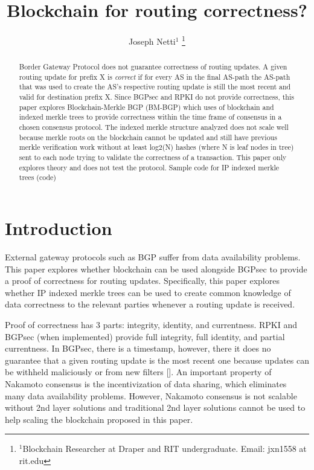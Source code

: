 \documentclass[letterpaper, 10 pt, conference]{ieeeconf}  %
\title{\LARGE \bf
Blockchain for routing correctness?
}
\author{Joseph Netti$^{1}$%
\thanks{$^{1}$Blockchain Researcher at Draper and RIT undergraduate. Email: jxn1558 at rit.edu}%
}
\begin{document}
\maketitle
\thispagestyle{empty}
\pagestyle{empty}


\begin{abstract}
Border Gateway Protocol does not guarantee correctness of routing updates. A given routing update for prefix X is \textit{correct} if for every AS in the final AS-path the AS-path that was used to create the AS’s respective routing update is still the most recent and valid for destination prefix X. Since BGPsec and RPKI do not provide correctness, this paper explores Blockchain-Merkle BGP (BM-BGP) which uses of blockchain and indexed merkle trees to provide correctness within the time frame of consensus in a chosen consensus protocol. The indexed merkle structure analyzed does not scale well because merkle roots on the blockchain cannot be updated and still have previous merkle verification work without at least log2(N) hashes (where N is leaf nodes in tree) sent to each node trying to validate the correctness of a transaction. This paper only explores theory and does not test the protocol. Sample code for IP indexed merkle trees (code)


\end{abstract}

\section{Introduction}
External gateway protocols such as BGP suffer from data availability problems. This paper explores whether blockchain can be used alongside BGPsec to provide a proof of correctness for routing updates. Specifically, this paper explores whether IP indexed merkle trees can be used to create common knowledge of data correctness to the relevant parties whenever a routing update is received.

Proof of correctness has 3 parts: integrity, identity, and currentness. RPKI and BGPsec (when implemented) provide full integrity, full identity, and partial currentness. In BGPsec, there is a timestamp, however, there it does no guarantee that a given routing update is the most recent one because updates can be withheld maliciously or from new filters []. An important property of Nakamoto consensus is the incentivization of data sharing, which eliminates many data availability problems. However, Nakamoto consensus is not scalable without 2nd layer solutions and traditional 2nd layer solutions cannot be used to help scaling the blockchain proposed in this paper. 
\end{document}
